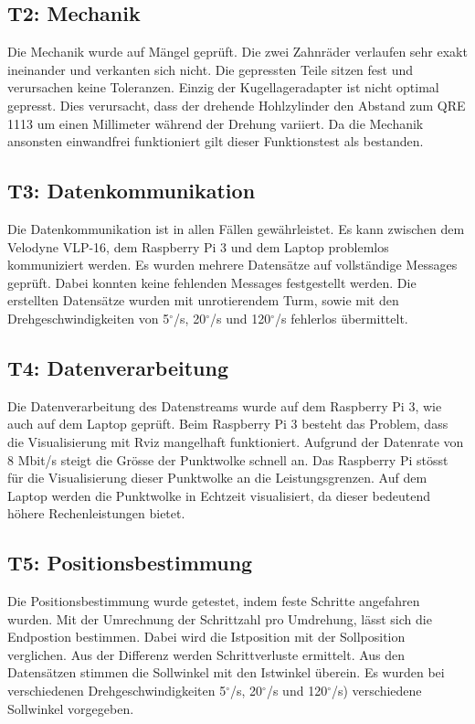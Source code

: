 \subsection {T2: Mechanik}
\label{subsec:Mechanik}
Die Mechanik wurde auf Mängel geprüft. Die zwei Zahnräder verlaufen sehr exakt ineinander und verkanten sich nicht. Die gepressten Teile sitzen fest und verursachen keine Toleranzen. Einzig der Kugellageradapter ist nicht optimal gepresst. Dies verursacht, dass der drehende Hohlzylinder den Abstand zum QRE 1113 um einen Millimeter während der Drehung variiert. Da die Mechanik ansonsten einwandfrei funktioniert gilt dieser Funktionstest als bestanden.

\subsection {T3: Datenkommunikation}
\label{subsec:Datenkimmuikation}
Die Datenkommunikation ist in allen Fällen gewährleistet. Es kann zwischen dem Velodyne VLP-16, dem Raspberry Pi 3 und dem Laptop problemlos kommuniziert werden. Es wurden mehrere Datensätze auf vollständige Messages geprüft. Dabei konnten keine fehlenden Messages festgestellt werden. Die erstellten Datensätze wurden mit unrotierendem Turm, sowie mit den Drehgeschwindigkeiten von 5$^\circ$/s, 20$^\circ$/s und 120$^\circ$/s fehlerlos übermittelt.  

\subsection {T4: Datenverarbeitung}
\label{subsec:Datenverarbeitung}
Die Datenverarbeitung des Datenstreams wurde auf dem Raspberry Pi 3, wie auch auf dem Laptop geprüft. Beim Raspberry Pi 3 besteht das Problem, dass die Visualisierung mit Rviz mangelhaft funktioniert. Aufgrund der Datenrate von 8 Mbit/s steigt die Grösse der Punktwolke schnell an. Das Raspberry Pi stösst für die Visualisierung dieser Punktwolke an die Leistungsgrenzen. Auf dem Laptop werden die Punktwolke in Echtzeit visualisiert, da dieser bedeutend höhere Rechenleistungen bietet. 

\subsection {T5: Positionsbestimmung}
\label{subsec:Positionsbestimmung}
Die Positionsbestimmung wurde getestet, indem feste Schritte angefahren wurden. Mit der Umrechnung der Schrittzahl pro Umdrehung, lässt sich die Endpostion bestimmen. Dabei wird die Istposition mit der Sollposition verglichen. Aus der Differenz werden Schrittverluste ermittelt. Aus den Datensätzen stimmen die Sollwinkel mit den Istwinkel überein. Es wurden bei verschiedenen Drehgeschwindigkeiten 5$^\circ$/s, 20$^\circ$/s und 120$^\circ$/s) verschiedene Sollwinkel vorgegeben.

